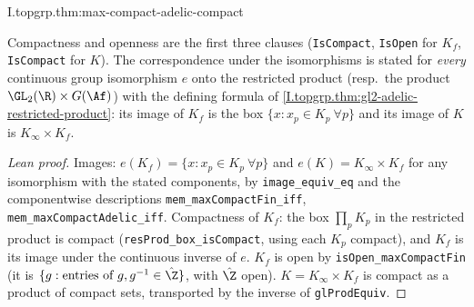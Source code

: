 \begin{theorem}
\end{theorem}
\begin{tfformal}{I.topgrp.thm:max-compact-adelic-compact}
\begin{tffidelity}
Compactness and openness are the first three clauses (\texttt{IsCompact}, \texttt{IsOpen} for $K_f$, \texttt{IsCompact} for $K$). The correspondence under the isomorphisms is stated for \emph{every} continuous group isomorphism $e$ onto the restricted product (resp.\ the product $\GL_2(\R)\times G(\Af)$) with the defining formula of \cref{I.topgrp.thm:gl2-adelic-restricted-product}: its image of $K_f$ is the box $\{x:x_p\in K_p\ \forall p\}$ and its image of $K$ is $K_\infty\times K_f$.
\end{tffidelity}
\end{tfformal}
\begin{proof}[Lean proof]
Images: $e(K_f)=\{x:x_p\in K_p\ \forall p\}$ and $e(K)=K_\infty\times K_f$ for any isomorphism with the stated components, by \texttt{image\_equiv\_eq} and the componentwise descriptions \texttt{mem\_maxCompactFin\_iff}, \texttt{mem\_maxCompactAdelic\_iff}. Compactness of $K_f$: the box $\prod_pK_p$ in the restricted product is compact (\texttt{resProd\_box\_isCompact}, using each $K_p$ compact), and $K_f$ is its image under the continuous inverse of $e$. $K_f$ is open by \texttt{isOpen\_maxCompactFin} (it is $\{g:\text{entries of }g,g^{-1}\in\hat\Z\}$, with $\hat\Z$ open). $K=K_\infty\times K_f$ is compact as a product of compact sets, transported by the inverse of \texttt{glProdEquiv}.
\end{proof}

